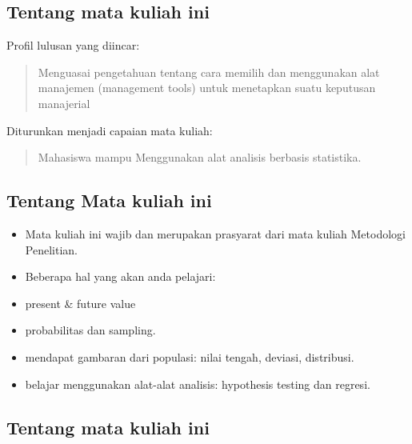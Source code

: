 \documentclass[
  letterpaper,
  DIV=11,
  numbers=noendperiod]{scrartcl}
\begin{document}
\hypertarget{tentang-mata-kuliah-ini}{%
\subsection{Tentang mata kuliah ini}\label{tentang-mata-kuliah-ini}}

Profil lulusan yang diincar:

\begin{quote}
Menguasai pengetahuan tentang cara memilih dan menggunakan alat
manajemen (management tools) untuk menetapkan suatu keputusan manajerial
\end{quote}

Diturunkan menjadi capaian mata kuliah:

\begin{quote}
Mahasiswa mampu Menggunakan alat analisis berbasis statistika.
\end{quote}

\hypertarget{tentang-mata-kuliah-ini-1}{%
\subsection{Tentang Mata kuliah ini}\label{tentang-mata-kuliah-ini-1}}

\begin{itemize}
\item
  Mata kuliah ini wajib dan merupakan prasyarat dari mata kuliah
  Metodologi Penelitian.
\item
  Beberapa hal yang akan anda pelajari:
\end{itemize}

\begin{itemize}
\item
  present \& future value
\item
  probabilitas dan sampling.
\item
  mendapat gambaran dari populasi: nilai tengah, deviasi, distribusi.
\item
  belajar menggunakan alat-alat analisis: hypothesis testing dan
  regresi.
\end{itemize}

\hypertarget{tentang-mata-kuliah-ini-2}{%
\subsection{Tentang mata kuliah ini}\label{tentang-mata-kuliah-ini-2}}
\end{document}
